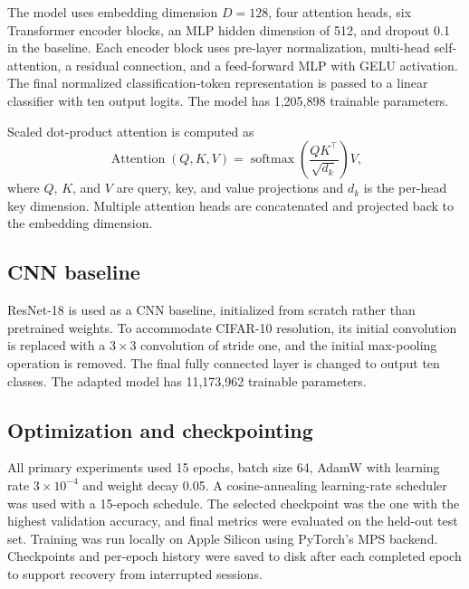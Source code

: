 \documentclass[conference]{IEEEtran}
\begin{document}
The model uses embedding dimension $D=128$, four attention heads, six Transformer encoder blocks, an MLP hidden dimension of 512, and dropout 0.1 in the baseline. Each encoder block uses pre-layer normalization, multi-head self-attention, a residual connection, and a feed-forward MLP with GELU activation. The final normalized classification-token representation is passed to a linear classifier with ten output logits. The model has 1,205,898 trainable parameters.

Scaled dot-product attention is computed as
\begin{equation}
\operatorname{Attention}(Q,K,V)
=\operatorname{softmax}\left(\frac{QK^\top}{\sqrt{d_k}}\right)V,
\end{equation}
where $Q$, $K$, and $V$ are query, key, and value projections and $d_k$ is the per-head key dimension. Multiple attention heads are concatenated and projected back to the embedding dimension.

\subsection{CNN baseline}
ResNet-18 \cite{he2016} is used as a CNN baseline, initialized from scratch rather than pretrained weights. To accommodate CIFAR-10 resolution, its initial convolution is replaced with a $3 \times 3$ convolution of stride one, and the initial max-pooling operation is removed. The final fully connected layer is changed to output ten classes. The adapted model has 11,173,962 trainable parameters.

\subsection{Optimization and checkpointing}
All primary experiments used 15 epochs, batch size 64, AdamW with learning rate $3 \times 10^{-4}$ and weight decay 0.05. A cosine-annealing learning-rate scheduler was used with a 15-epoch schedule. The selected checkpoint was the one with the highest validation accuracy, and final metrics were evaluated on the held-out test set. Training was run locally on Apple Silicon using PyTorch's MPS backend. Checkpoints and per-epoch history were saved to disk after each completed epoch to support recovery from interrupted sessions.
\end{document}
